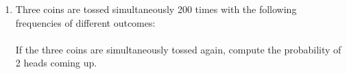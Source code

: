 \renewcommand{\theequation}{\theenumi}
\begin{enumerate}[label=\arabic*.,ref=\thesubsection.\theenumi]
\item Three coins are tossed simultaneously 200 times with the following frequencies of different outcomes:\\

\\

If the three coins are simultaneously tossed again, compute the probability of 2 heads coming up.
\end{enumerate}